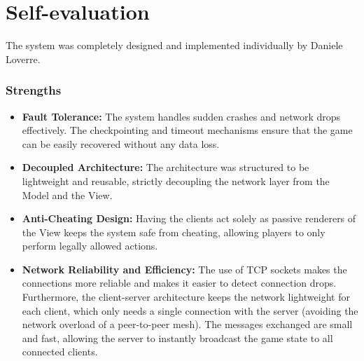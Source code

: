 \documentclass{scrartcl}
\begin{document}
\section{Self-evaluation}\label{self-evaluation}
The system was completely designed and implemented individually by Daniele Loverre.

\subsubsection*{Strengths}
\begin{itemize}
    \item \textbf{Fault Tolerance:} The system handles sudden crashes and network drops effectively.
    The checkpointing and timeout mechanisms ensure that the game can be easily recovered without any data loss.
    \item \textbf{Decoupled Architecture:} The architecture was structured to be lightweight and reusable,
    strictly decoupling the network layer from the Model and the View.
    \item \textbf{Anti-Cheating Design:} Having the clients act solely as passive renderers of the View keeps the system safe from cheating,
    allowing players to only perform legally allowed actions.
    \item \textbf{Network Reliability and Efficiency:} The use of TCP sockets makes the connections
    more reliable and makes it easier to detect connection drops.
    Furthermore, the client-server architecture keeps the network lightweight for each client,
    which only needs a single connection with the server (avoiding the network overload of a peer-to-peer mesh).
    The messages exchanged are small and fast, allowing the server to instantly broadcast the game state to all connected clients.
\end{itemize}
\end{document}
